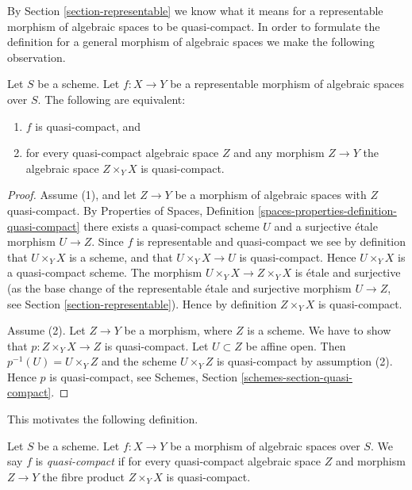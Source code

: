 \noindent
By Section \ref{section-representable} we know what it means for
a representable morphism of algebraic spaces to be quasi-compact.
In order to formulate the definition for a general morphism
of algebraic spaces we make the following observation.

\begin{lemma}
\label{lemma-characterize-representable-quasi-compact}
Let $S$ be a scheme.
Let $f : X \to Y$ be a representable morphism of algebraic spaces over $S$.
The following are equivalent:
\begin{enumerate}
\item $f$ is quasi-compact, and
\item for every quasi-compact algebraic space $Z$ and any morphism
$Z \to Y$ the algebraic space $Z \times_Y X$ is quasi-compact.
\end{enumerate}
\end{lemma}

\begin{proof}
Assume (1), and let $Z \to Y$ be a morphism of algebraic spaces with
$Z$ quasi-compact. By
Properties of Spaces,
Definition \ref{spaces-properties-definition-quasi-compact}
there exists a quasi-compact scheme $U$ and a surjective \'etale
morphism $U \to Z$. Since $f$ is representable and quasi-compact
we see by definition that $U \times_Y X$ is a scheme, and that
$U \times_Y X \to U$ is quasi-compact. Hence $U \times_Y X$ is
a quasi-compact scheme. The morphism $U \times_Y X \to Z \times_Y X$
is \'etale and surjective (as the base change of the representable
\'etale and surjective morphism $U \to Z$, see
Section \ref{section-representable}).
Hence by definition $Z \times_Y X$ is quasi-compact.

\medskip\noindent
Assume (2). Let $Z \to Y$ be a morphism, where $Z$ is a scheme.
We have to show that $p : Z \times_Y X \to Z$ is quasi-compact.
Let $U \subset Z$ be affine open. Then $p^{-1}(U) = U \times_Y Z$
and the scheme $U \times_Y Z$ is quasi-compact by assumption (2).
Hence $p$ is quasi-compact, see
Schemes, Section \ref{schemes-section-quasi-compact}.
\end{proof}

\noindent
This motivates the following definition.

\begin{definition}
\label{definition-quasi-compact}
Let $S$ be a scheme.
Let $f : X \to Y$ be a morphism of algebraic spaces over $S$.
We say $f$ is {\it quasi-compact} if for every quasi-compact
algebraic space $Z$ and morphism $Z \to Y$ the fibre product
$Z \times_Y X$ is quasi-compact.
\end{definition}

